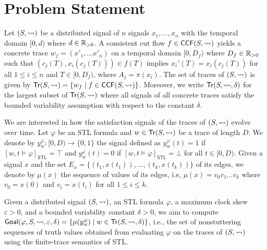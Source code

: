 \section{Problem Statement}
Let $(S,{\rightsquigarrow})$ be a distributed signal of $n$ signals $x_1, \ldots, x_n$ with the temporal domain $[0,d)$ where $d \in \mathbb{R}_{> 0}$.
A consistent cut flow $f \in \mathsf{CCF}(S,{\rightsquigarrow})$ yields a concrete trace $w_f = (x'_1, \ldots x'_n)$ on a temporal domain $[0,D_f)$ where $D_f \in \mathbb{R}_{> 0}$ such that $(c_j(T), x_i(c_j(T))) \in f(T)$ implies $x_i'(T) = x_i(c_j(T))$ for all $1 \leq i \leq n$ and $T \in [0, D_f)$, where $A_j = \pi(x_i)$.
The set of traces of $(S,{\rightsquigarrow})$ is given by $\tr(S,{\hb}) = \{ w_f \st f \in \CCF(S,{\hb})\}$.
Moreover, we write $\mathsf{Tr}(S,{\rightsquigarrow},\delta)$ for the largest subset of $\mathsf{Tr}(S,{\rightsquigarrow})$ where all signals of all concrete traces satisfy the bounded variability assumption with respect to the constant $\delta$.

We are interested in how the satisfaction signals of the traces of $(S,{\rightsquigarrow})$ evolve over time.
Let $\varphi$ be an STL formula and $w \in \mathsf{Tr}(S,{\rightsquigarrow})$ be a trace of length $D$.
We denote by $y_w^\varphi : [0,D) \to \{0,1\}$ the signal defined as $y_w^\varphi(t) = 1$ if $[w, t \models \varphi]_{\mathsf{STL}} = \top$ and $y_w^\varphi(t) = 0$ if $[w, t \models \varphi]_{\mathsf{STL}} = \bot$ for all $t \in [0,D)$.
Given a signal $x$ and the set $E_x = \{(t_1, x(t_1)), \ldots, (t_k, x(t_k))\}$ of its edges, we denote by $\mu(x)$ the sequence of values of its edges, i.e, $\mu(x) = v_0 v_1 \ldots v_k$ where $v_0 = x(0)$ and $v_i = x(t_i)$ for all $1 \leq i \leq k$.

Given a distributed signal $(S, {\rightsquigarrow})$, an STL formula $\varphi$, a maximum clock skew $\varepsilon > 0$, and a bounded variability constant $\delta > 0$, we aim to compute $\mathsf{Goal}(\varphi, S, {\hb}, \varepsilon, \delta) = \{ \mu(y_w^\varphi) \st w \in \tr(S, {\hb}, \delta) \}$, i.e., the set of nonstuttering sequences of truth values obtained from evaluating $\varphi$ on the traces of $(S, {\rightsquigarrow})$ using the finite-trace semantics of STL.